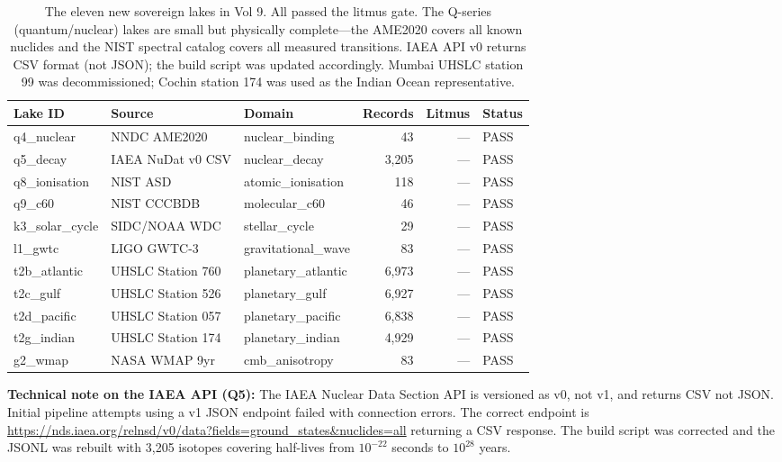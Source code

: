 \documentclass[11pt, letterpaper, openany]{book}
\begin{document}
\begin{table}[H]
\centering
\renewcommand{\arraystretch}{1.4}
\small
\begin{tabular}{|l|l|l|r|r|l|}
\hline
\rowcolor{kishblue!10}
\textbf{Lake ID} & \textbf{Source} & \textbf{Domain} & \textbf{Records} & \textbf{Litmus} & \textbf{Status} \\
\hline\hline
q4\_nuclear   & NNDC AME2020      & nuclear\_binding    &    43 & — & PASS \\
q5\_decay     & IAEA NuDat v0 CSV & nuclear\_decay      & 3,205 & — & PASS \\
q8\_ionisation & NIST ASD         & atomic\_ionisation  &   118 & — & PASS \\
q9\_c60       & NIST CCCBDB       & molecular\_c60      &    46 & — & PASS \\
k3\_solar\_cycle & SIDC/NOAA WDC  & stellar\_cycle      &    29 & — & PASS \\
l1\_gwtc      & LIGO GWTC-3       & gravitational\_wave &    83 & — & PASS \\
t2b\_atlantic & UHSLC Station 760 & planetary\_atlantic & 6,973 & — & PASS \\
t2c\_gulf     & UHSLC Station 526 & planetary\_gulf     & 6,927 & — & PASS \\
t2d\_pacific  & UHSLC Station 057 & planetary\_pacific  & 6,838 & — & PASS \\
t2g\_indian   & UHSLC Station 174 & planetary\_indian   & 4,929 & — & PASS \\
g2\_wmap      & NASA WMAP 9yr     & cmb\_anisotropy     &    83 & — & PASS \\
\hline
\end{tabular}
\caption{The eleven new sovereign lakes in Vol 9. All passed the litmus gate.
The Q-series (quantum/nuclear) lakes are small but physically complete---the AME2020
covers all known nuclides and the NIST spectral catalog covers all measured
transitions. IAEA API v0 returns CSV format (not JSON); the build script was
updated accordingly. Mumbai UHSLC station 99 was decommissioned; Cochin station 174
was used as the Indian Ocean representative.}
\label{tab:v9_new_lakes}
\end{table}

\textbf{Technical note on the IAEA API (Q5):} The IAEA Nuclear Data Section API
is versioned as v0, not v1, and returns CSV not JSON. Initial pipeline attempts
using a v1 JSON endpoint failed with connection errors. The correct endpoint is
\url{https://nds.iaea.org/relnsd/v0/data?fields=ground_states&nuclides=all}
returning a CSV response. The build script was corrected and the JSONL was rebuilt
with 3,205 isotopes covering half-lives from $10^{-22}$ seconds to $10^{28}$ years.
\end{document}
